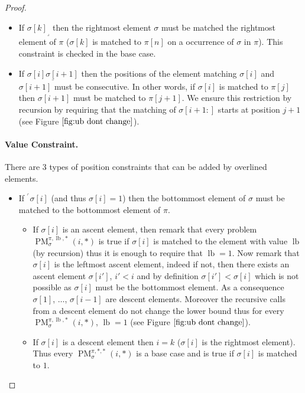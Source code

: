 \documentclass[a4paper]{llncs}
\newcommand{\ptext}{\pi}
\newcommand{\ppattern}{\sigma}
\DeclareMathOperator{\PMa}{PM}
\newcommand{\PM}[6]{\PMa_{{#1}}^{{#2},{#3},{#4}}({#5},{#6})}
\DeclareMathOperator{\lb}{lb}
\begin{document}
\begin{proof}
\begin{itemize}
	\item If ${\ppattern[k]}_\lrcorner$ then the rightmost element $\sigma$ must be matched the rightmost element of $\pi$ ($\ppattern[k]$ is matched to $\ptext[n]$ on a occurrence of $\ppattern$ in $\ptext$). This constraint is checked in the base case.

	\item If $\underline{\ppattern[i]\ppattern[i+1]}$ then the positions of the element matching $\ppattern[i]$ and $\ppattern[i+1]$ must be consecutive. In other words, if $\ppattern[i]$ is matched to $\ptext[j]$ then $\ppattern[i+1]$ must be matched to $\ptext[j+1]$. We ensure this restriction by recursion by requiring that the matching of $\ppattern[i+1:]$ starts at position $j+1$ (see Figure $\ref{fig:ub dont change}$).
\end{itemize}

\paragraph{Value Constraint.} There are 3 types of position constraints that can be added by overlined elements.
\begin{itemize}
	\item If $^\ulcorner{\sigma[i]}$ (and thus $\sigma[i]=1$) then the bottommost element of $\ppattern$ must be matched to the bottommost element of $\ptext$.
	\begin{itemize}

		\item If $\sigma[i]$ is an ascent element, then remark that 
		every problem 
		$\PM{\sigma}{\ptext}{\lb}{*}{i}{*}$ is true if $\sigma[i]$ is matched to the element with value $\lb$ (by recursion) thus it is enough to require that $\lb=1$.
		Now remark that $\sigma[i]$ is the leftmost ascent element, indeed if not, then there exists an ascent element $\sigma[i']$, $i'<i$ and by definition $\sigma[i']<\sigma[i]$ which is not possible as $\sigma[i]$ must be the bottommost element. 
		As a consequence $\sigma[1]$, $\ldots$, $\sigma[i-1]$ are descent elements.
		Moreover the recursive calls from a descent element do not change the lower bound
		thus for every $\PM{\sigma}{\ptext}{\lb}{*}{i}{*}$, $\lb=1$ (see Figure $\ref{fig:ub dont change}$). 			

		\item If $\sigma[i]$ is a descent element then $i=k$ ($\sigma[i]$ is the rightmost element). Thus every $\PM{\sigma}{\ptext}{*}{*}{i}{*}$ is a base case and is true if $\sigma[i]$ is matched to $1$.


\end{itemize}
\end{itemize}
\end{proof}
\end{document}
